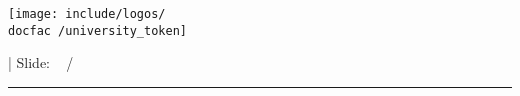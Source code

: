 {
	\hspace*{0.02\textwidth}
	\begin{minipage}[m]{0.3\textwidth}
		\vspace*{3ex}
		\texttt{[image: include/logos/\\docfac /university\_token]}
	\end{minipage}
	\begin{minipage}[m]{0.45\textwidth}
		\vspace*{3ex}
		\doctitle 
	\end{minipage}
	\hfill
	\begin{minipage}[m]{0.14\textwidth}
		\vspace*{3ex}
		| Slide: \hfill \insertframenumber ~ / \inserttotalframenumber
		\hspace*{0.1\textwidth}
	\end{minipage}
	\color{\docfac }
	\rule{\paperwidth}{1pt}
}
%
%
%

